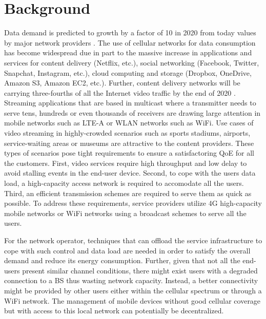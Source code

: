 \section{Background}\label{sec:background}
Data demand is predicted to growth by a factor of 10 in 2020 from today values by major network providers \cite{cisco2016forecast,kremling2015presentation,belllabs2016report,ericsson2015report}. The use of cellular networks for data consumption has become
widespread due in part to the massive increase in applications and services for content delivery (Netflix, etc.), social networking (Facebook, Twitter, Snapchat, Instagram, etc.), cloud computing and storage (Dropbox, OneDrive, Amazon S3, Amazon EC2, etc.). Further, content delivery networks will be carrying three-fourths of all the Internet video traffic by the end of 2020 \cite{cisco2016forecast}. Streaming applications that are based in multicast where a transmitter needs to serve tens, hundreds or even thousands of receivers are drawing large attention in mobile networks such as \ac{LTE-A} or \ac{WLAN} networks such as \ac{WiFi}. Use cases of video streaming in highly-crowded scenarios such as sports stadiums, airports, service-waiting areas or museums are attractive to the content providers. These types of scenarios pose tight requirements to ensure a satisfactoring \ac{QoE} for all the customers. First, video services require high throughput and low delay to avoid stalling events in the end-user device. Second, to cope with the users data load, a high-capacity access network is required to accomodate all the users. Third, an efficient transmission schemes are required to serve them as quick as possible. To address these requirements, service providers utilize 4G high-capacity mobile networks or \ac{WiFi} networks using a broadcast schemes to serve all the users.

For the network operator, techniques that can offload the service infrastructure to cope with such control and data load are needed in order to satisfy the overall demand and reduce its energy consumption. Further, given that not all the end-users present similar channel conditions, there might exist users with a degraded connection to a \ac{BS} thus wasting network capacity. Instead, a better connectivity might be provided by other users either within the cellular spectrum or through a \ac{WiFi} network. The management of mobile devices without good cellular coverage but with access to this local network can potentially be decentralized.

